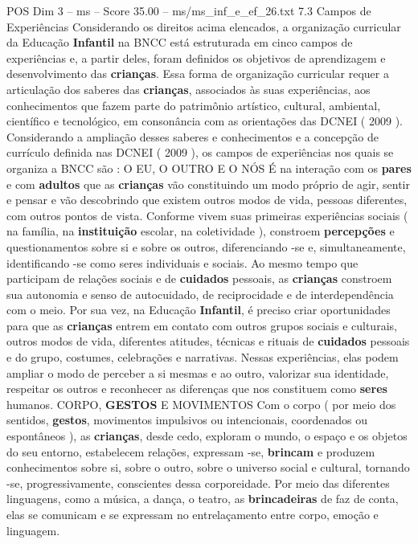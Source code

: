 \begin{textsample}{POS Dim 3 – ms – Score 35.00 – ms/ms\_inf\_e\_ef\_26.txt}  \label{ex:f3_pos_191}
7.3 Campos de Experiências Considerando os direitos acima elencados, a organização curricular da Educação \textbf{Infantil} na BNCC está estruturada em cinco campos de experiências e, a partir deles, foram definidos os objetivos de aprendizagem e desenvolvimento das \textbf{crianças}.
Essa forma de organização curricular requer a articulação dos saberes das \textbf{crianças}, associados às suas experiências, aos conhecimentos que fazem parte do patrimônio artístico, cultural, ambiental, científico e tecnológico, em consonância com as orientações das DCNEI ( 2009 ).
Considerando a ampliação desses saberes e conhecimentos e a concepção de currículo definida nas DCNEI ( 2009 ), os campos de experiências nos quais se organiza a BNCC são : O EU, O OUTRO E O NÓS É na interação com os \textbf{pares} e com \textbf{adultos} que as \textbf{crianças} vão constituindo um modo próprio de agir, sentir e pensar e vão descobrindo que existem outros modos de vida, pessoas diferentes, com outros pontos de vista.
Conforme vivem suas primeiras experiências sociais ( na família, na \textbf{instituição} escolar, na coletividade ), constroem \textbf{percepções} e questionamentos sobre si e sobre os outros, diferenciando -se e, simultaneamente, identificando -se como seres individuais e sociais.
Ao mesmo tempo que participam de relações sociais e de \textbf{cuidados} pessoais, as \textbf{crianças} constroem sua autonomia e senso de autocuidado, de reciprocidade e de interdependência com o meio.
Por sua vez, na Educação \textbf{Infantil}, é preciso criar oportunidades para que as \textbf{crianças} entrem em contato com outros grupos sociais e culturais, outros modos de vida, diferentes atitudes, técnicas e rituais de \textbf{cuidados} pessoais e do grupo, costumes, celebrações e narrativas.
Nessas experiências, elas podem ampliar o modo de perceber a si mesmas e ao outro, valorizar sua identidade, respeitar os outros e reconhecer as diferenças que nos constituem como \textbf{seres} humanos.
CORPO, \textbf{GESTOS} E MOVIMENTOS Com o corpo ( por meio dos sentidos, \textbf{gestos}, movimentos impulsivos ou intencionais, coordenados ou espontâneos ), as \textbf{crianças}, desde cedo, exploram o mundo, o espaço e os objetos do seu entorno, estabelecem relações, expressam -se, \textbf{brincam} e produzem conhecimentos sobre si, sobre o outro, sobre o universo social e cultural, tornando -se, progressivamente, conscientes dessa corporeidade.
Por meio das diferentes linguagens, como a música, a dança, o teatro, as \textbf{brincadeiras} de faz de conta, elas se comunicam e se expressam no entrelaçamento entre corpo, emoção e linguagem.

\end{textsample}
